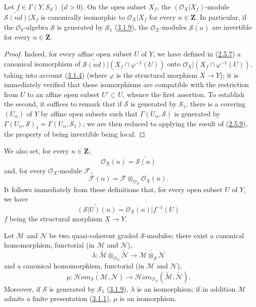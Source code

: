 \begin{proposition}[3.2.5]
\label{II.3.2.5}
Let $f\in\Gamma(Y,\mathcal{S}_d)$ ($d>0$). On the open subset $X_f$, the
$(\mathcal{O}_X|X_f)$-module
$\widetilde{\mathcal{S}(nd)}|X_f$ is canonically isomorphic to
$\mathcal{O}_X|X_f$ for every $n\in\mathbf{Z}$. In particular, if the
$\mathcal{O}_Y$-algebra $\mathcal{S}$ is generated by $\mathcal{S}_1$
(\hyperref[II.3.1.9]{3.1.9}), the $\mathcal{O}_X$-modules
$\widetilde{\mathcal{S}(n)}$ are invertible for every $n\in\mathbf{Z}$.
\end{proposition}

\begin{proof}
Indeed, for every affine open subset $U$ of $Y$, we have defined in
(\hyperref[II.2.5.7]{2.5.7}) a canonical isomorphism of
$\widetilde{\mathcal{S}(nd)}|(X_f\cap\varphi^{-1}(U))$ onto
$\mathcal{O}_X|(X_f\cap\varphi^{-1}(U))$, taking into account
(\hyperref[II.3.1.4]{3.1.4}) (where $\varphi$ is the structural morphism
$X\to Y$); it is immediately verified that these isomorphisms are compatible
with the restriction from $U$ to an affine open subset $U'\subset U$, whence
the first assertion. To establish the second, it suffices to remark that if
$\mathcal{S}$ is generated by $\mathcal{S}_1$, there is a covering
$(U_\alpha)$ of $Y$ by affine open subsets such that
$\Gamma(U_\alpha,\mathcal{S})$ is generated by
$\Gamma(U_\alpha,\mathcal{S})_1=\Gamma(U_\alpha,\mathcal{S}_1)$; we are then
reduced to applying the result of (\hyperref[II.2.5.9]{2.5.9}), the
property of being invertible being local.
\end{proof}

We also set, for every $n\in\mathbf{Z}$,
\[
\label{II.3.2.5.1}
  \mathcal{O}_X(n)=\widetilde{\mathcal{S}(n)}
\tag{3.2.5.1}
\]
and, for every $\mathcal{O}_X$-module $\mathcal{F}$,
\[
\label{II.3.2.5.2}
  \mathcal{F}(n)=\mathcal{F}\otimes_{\mathcal{O}_X}\mathcal{O}_X(n).
\tag{3.2.5.2}
\]
It follows immediately from these definitions that, for every open subset
$U$ of $Y$, we have
\[
  \widetilde{(\mathcal{S}|U)(n)}
  =\mathcal{O}_X(n)|f^{-1}(U)
\]
$f$ being the structural morphism $X\to Y$.

\begin{proposition}[3.2.6]
\label{II.3.2.6}
Let $\mathcal{M}$ and $\mathcal{N}$ be two quasi-coherent graded
$\mathcal{S}$-modules; there exist a canonical homomorphism, functorial (in
$\mathcal{M}$ and $\mathcal{N}$),
\[
\label{II.3.2.6.1}
  \lambda:\widetilde{\mathcal{M}}
  \otimes_{\mathcal{O}_X}\widetilde{\mathcal{N}}
  \longrightarrow\widetilde{\mathcal{M}\otimes_{\mathcal{S}}\mathcal{N}}
\tag{3.2.6.1}
\]
and a canonical homomorphism, functorial (in $\mathcal{M}$ and
$\mathcal{N}$),
\[
\label{II.3.2.6.2}
  \mu:\widetilde{\mathcal{H}om_{\mathcal{S}}(\mathcal{M},\mathcal{N})}
  \longrightarrow
  \mathcal{H}om_{\mathcal{O}_X}
  (\widetilde{\mathcal{M}},\widetilde{\mathcal{N}}).
\tag{3.2.6.2}
\]
Moreover, if $\mathcal{S}$ is generated by $\mathcal{S}_1$
(\hyperref[II.3.1.9]{3.1.9}), $\lambda$ is an isomorphism; if in addition
$\mathcal{M}$ admits a finite presentation
(\hyperref[II.3.1.1]{3.1.1}), $\mu$ is an isomorphism.
\end{proposition}

